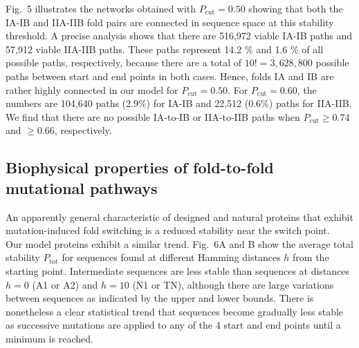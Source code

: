 \documentclass[
aip,
rsi,%
amsmath,amssymb,
reprint,%
]{revtex4-1}
\newcommand {\Pcut}     	{{P_\mathrm{cut}}}
\newcommand {\Ptot}	{{P_\mathrm{tot}}}
\begin{document}
Fig.~5 illustrates the networks obtained with $\Pcut=0.50$ showing that both the IA-IB and IIA-IIB fold pairs are connected in sequence space at this stability threshold. A precise analysis shows that there are 516,972 viable IA-IB paths and 57,912 viable IIA-IIB paths. These paths represent 14.2 \% and 1.6 \% of all possible paths, respectively, because there are a total of $10! =3,628,800$ possible paths between start and end points in both cases. Hence, folds IA and IB are rather highly connected in our model for $\Pcut= 0.50$. For $\Pcut=0.60$, the numbers are 104,640 paths (2.9\%) for IA-IB and 22,512 (0.6\%) paths for IIA-IIB. We find that there are no possible IA-to-IB or IIA-to-IIB paths when $\Pcut\ge0.74$ and $\ge 0.66$, respectively. \\

\subsection{Biophysical properties of fold-to-fold mutational pathways}
 
An apparently general characteristic of designed and natural proteins that exhibit mutation-induced fold switching is a reduced stability near the switch point.~\cite{Alexander2009,He2012,Kouza2012,Sikosek2016,Sutto2012} Our model proteins exhibit a similar trend. Fig.~6A and B show the average total stability $\Ptot$ for sequences found at different Hamming distances $h$ from the starting point. Intermediate sequences are less stable than sequences at distances $h=0$ (A1 or A2) and $h=10$ (N1 or TN), although there are large variations between sequences as indicated by the upper and lower bounds. There is nonetheless a clear statistical trend that sequences become gradually less stable as successive mutations are applied to any of the 4 start and end points until a minimum is reached. 
\end{document}
